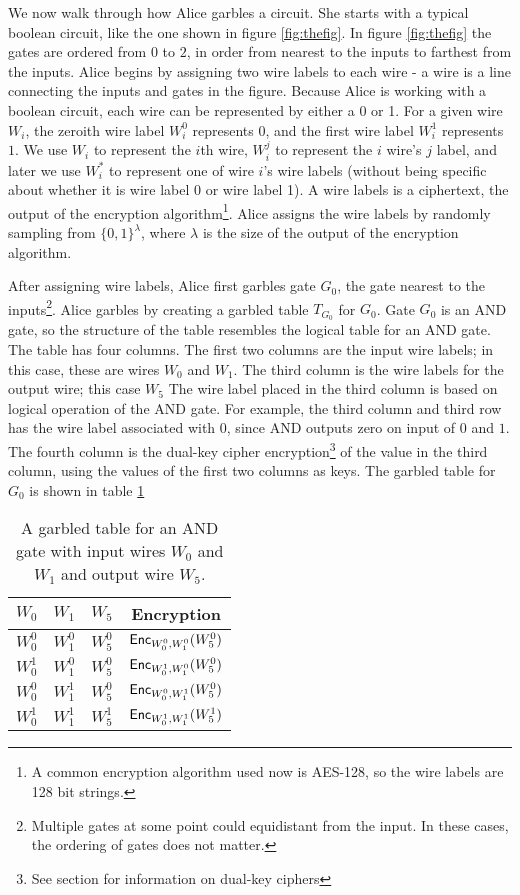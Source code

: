 We now walk through how Alice garbles a circuit.
She starts with a typical boolean circuit, like the one shown in figure \ref{fig:thefig}.
In figure \ref{fig:thefig} the gates are ordered from $0$ to $2$, in order from nearest to the inputs to farthest from the inputs.
Alice begins by assigning two wire labels to each wire - a wire is a line connecting the inputs and gates in the figure.
Because Alice is working with a boolean circuit, each wire can be represented by either a 0 or 1.
For a given wire $W_i$, the zeroith wire label $W_i^0$ represents $0$, and the first wire label $W_i^1$ represents $1$.
We use $W_i$ to represent the $i$th wire, $W_i^j$ to represent the $i$ wire's $j$ label, and later we use $W_i^*$ to represent one of wire $i$'s wire labels (without being specific about whether it is wire label 0 or wire label 1).
A wire labels is a ciphertext, the output of the encryption algorithm\footnote{A common encryption algorithm used now is AES-128, so the wire labels are 128 bit strings.}.
Alice assigns the wire labels by randomly sampling from $\{0,1\}^{\lambda}$, where $\lambda$ is the size of the output of the encryption algorithm.

After assigning wire labels, Alice first garbles gate $G_0$, the gate nearest to the inputs\footnote{Multiple gates at some point could equidistant from the input. In these cases, the ordering of gates does not matter.}.
Alice garbles by creating a garbled table $T_{G_0}$ for $G_0$.
Gate $G_0$ is an AND gate, so the structure of the table resembles the logical table for an AND gate.
The table has four columns. 
The first two columns are the input wire labels; in this case, these are wires $W_0$ and $W_1$.
The third column is the wire labels for the output wire; this case $W_5$
The wire label placed in the third column is based on logical operation of the AND gate.
For example, the third column and third row has the wire label associated with $0$, since AND outputs zero on input of $0$ and $1$.
The fourth column is the dual-key cipher encryption\footnote{See section  for information on dual-key ciphers} of the value in the third column, using the values of the first two columns as keys.
The garbled table for $G_0$ is shown in table \ref{tbl:g0-table}

\begin{table}[h]
\centering
\label{tbl:g0-table}
\begin{tabular}{|c|c|c|c|}
\hline
$W_0$ & $W_1$ & $W_5$ & Encryption \\
\hline
$W_0^0$ & $W_1^0$ & $W_5^0$ & $\textsf{Enc}_{W_0^0, W_1^0}(W_5^0)$ \\
$W_0^1$ & $W_1^0$ & $W_5^0$ & $\textsf{Enc}_{W_0^1, W_1^0}(W_5^0)$ \\
$W_0^0$ & $W_1^1$ & $W_5^0$ & $\textsf{Enc}_{W_0^0, W_1^1}(W_5^0)$ \\
$W_0^1$ & $W_1^1$ & $W_5^1$ & $\textsf{Enc}_{W_0^1, W_1^1}(W_5^1)$ \\
\hline
\end{tabular}
\caption{A garbled table for an AND gate with input wires $W_0$ and $W_1$ and output wire $W_5$.}
\end{table}

